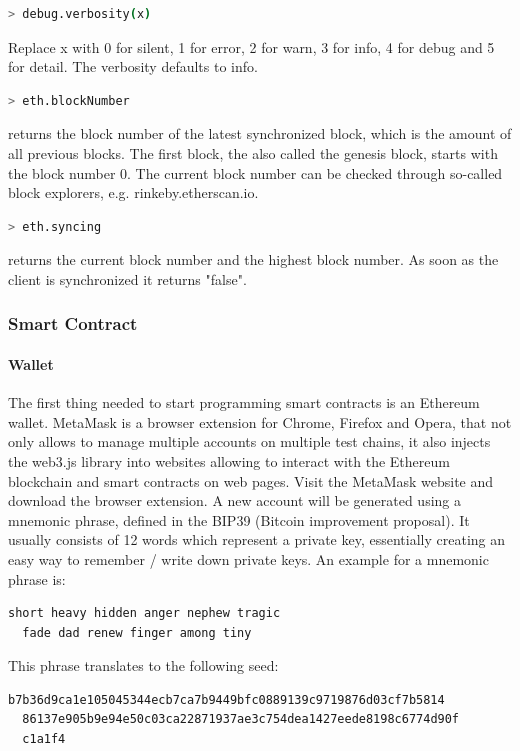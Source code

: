 \begin{lstlisting}[language=bash]
  > debug.verbosity(x)
\end{lstlisting}

Replace x with 0 for silent, 1 for error, 2 for warn, 3 for info, 4 for debug and 5 for detail. The verbosity defaults to info\cite{cli-options}.
\newpage

\begin{lstlisting}[language=bash]
  > eth.blockNumber
\end{lstlisting}

returns the block number of the latest synchronized block, which is the amount of all previous blocks. The first block, the also called the genesis block, starts with the block number 0. The current block number can be checked through so-called block explorers, e.g. {rinkeby.etherscan.io}.
\\
\begin{lstlisting}[language=bash]
  > eth.syncing
\end{lstlisting}
returns the current block number and the highest block number. As soon as the client is synchronized it returns "false"\cite{javascript-0.20}.


\subsubsection{Smart Contract}
\paragraph{Wallet}
The first thing needed to start programming smart contracts is an Ethereum wallet. MetaMask is a browser extension for Chrome, Firefox and Opera, that not only allows to manage multiple accounts on multiple test chains, it also injects the web3.js library into websites allowing to interact with the Ethereum blockchain and smart contracts on web pages.
Visit the MetaMask\cite{metamask} website and download the browser extension. A new account will be generated using a mnemonic phrase, defined in the BIP39 (Bitcoin improvement proposal)\cite{bip39}. It usually consists of 12 words which represent a private key, essentially creating an easy way to remember / write down private keys. An example for a mnemonic phrase is:
\begin{lstlisting}[language=bash]
  short heavy hidden anger nephew tragic
  fade dad renew finger among tiny
\end{lstlisting}
This phrase translates to the following seed:
\begin{lstlisting}[language=bash]
  b7b36d9ca1e105045344ecb7ca7b9449bfc0889139c9719876d03cf7b5814
  86137e905b9e94e50c03ca22871937ae3c754dea1427eede8198c6774d90f
  c1a1f4
\end{lstlisting}

